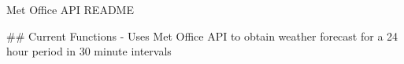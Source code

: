Met Office API README

## Current Functions
- Uses Met Office API to obtain weather forecast for a 24 hour period in 30 minute intervals